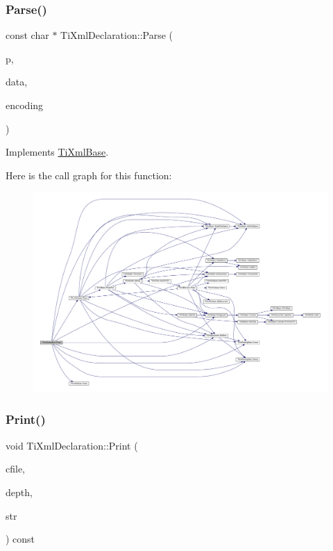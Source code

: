 \subsubsection{\texorpdfstring{Parse()}{Parse()}}
{\footnotesize\ttfamily const char $\ast$ Ti\+Xml\+Declaration\+::\+Parse (\begin{DoxyParamCaption}\item[{const char $\ast$}]{p,  }\item[{\hyperlink{class_ti_xml_parsing_data}{Ti\+Xml\+Parsing\+Data} $\ast$}]{data,  }\item[{\hyperlink{tinyxml_8h_a88d51847a13ee0f4b4d320d03d2c4d96}{Ti\+Xml\+Encoding}}]{encoding }\end{DoxyParamCaption})\hspace{0.3cm}{\ttfamily [virtual]}}



Implements \hyperlink{class_ti_xml_base_a00e4edb0219d00a1379c856e5a1d2025}{Ti\+Xml\+Base}.

Here is the call graph for this function\+:\nopagebreak
\begin{figure}[H]
\begin{center}
\leavevmode
\includegraphics[width=350pt]{class_ti_xml_declaration_a9839ea97ed687a2b7342fd7b0f04361b_cgraph}
\end{center}
\end{figure}
\mbox{\label{class_ti_xml_declaration_ace687d02a5a25a060ae3802abb1b3f55}} 
\subsubsection{\texorpdfstring{Print()}{Print()}\hspace{0.1cm}{\footnotesize\ttfamily [1/2]}}
{\footnotesize\ttfamily void Ti\+Xml\+Declaration\+::\+Print (\begin{DoxyParamCaption}\item[{F\+I\+LE $\ast$}]{cfile,  }\item[{int}]{depth,  }\item[{\hyperlink{tinyxml_8h_a92bada05fd84d9a0c9a5bbe53de26887}{T\+I\+X\+M\+L\+\_\+\+S\+T\+R\+I\+NG} $\ast$}]{str }\end{DoxyParamCaption}) const\hspace{0.3cm}{\ttfamily [virtual]}}

